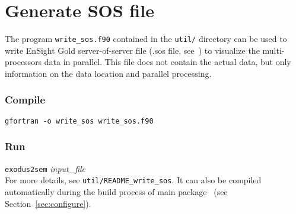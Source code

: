 \section{Generate SOS file}
\label{sec:sos}

The program \texttt{write\_sos.f90} contained in the \texttt{util/} directory can be used to write EnSight Gold server-of-server file (.sos file, see~\citep{ensight2008}) to visualize the multi-processors data in parallel. This file does not contain the actual data, but only information on the data location and parallel processing.
\subsubsection*{Compile}
\texttt{gfortran -o write\_sos write\_sos.f90}
\subsubsection*{Run}
\texttt{exodus2sem} {\it{input\_file}}\\

For more details, see \texttt{util/README\_write\_sos}. It can also be compiled automatically during the build process of main package \pack\ (see Section~\ref{sec:configure}).
